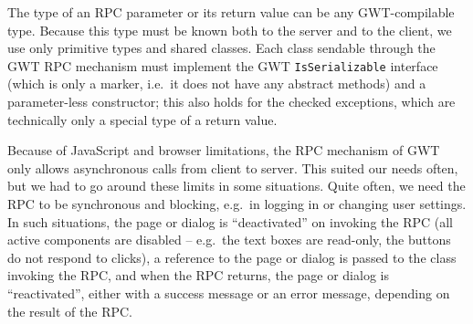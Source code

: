 The type of an RPC parameter or its return value can be any GWT-compilable type. Because this type must be known both to the server and to the client, we use only primitive types and shared classes. Each class sendable through the GWT RPC mechanism must implement the GWT {\tt IsSerializable} interface (which is only a marker, i.e.\ it does not have any abstract methods) and a parameter-less constructor; this also holds for the checked exceptions, which are technically only a special type of a return value.

Because of JavaScript and browser limitations, the RPC mechanism of GWT only allows asynchronous calls from client to server. This suited our needs often, but we had to go around these limits in some situations. Quite often, we need the RPC to be synchronous and blocking, e.g.\ in logging in or changing user settings. In such situations, the page or dialog is ``deactivated'' on invoking the RPC (all active components are disabled -- e.g.\ the text boxes are read-only, the buttons do not respond to clicks), a reference to the page or dialog is passed to the class invoking the RPC, and when the RPC returns, the page or dialog is ``reactivated'', either with a success message or an error message, depending on the result of the RPC.

